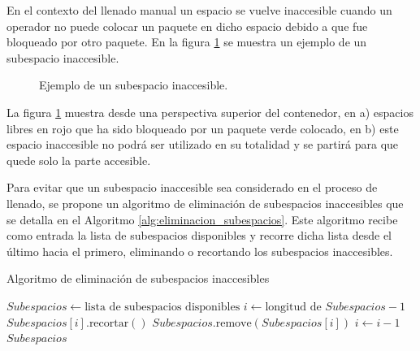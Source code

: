 \documentclass[openany]{article}
\begin{document}
En el contexto del llenado manual un espacio se vuelve inaccesible cuando un operador no puede colocar un paquete en dicho espacio debido a que fue bloqueado por otro paquete. En la figura \ref{fig:subespacio_inaccesible} se muestra un ejemplo de un subespacio inaccesible.

\begin{figure}[H]
    \centering
    
    \caption{Ejemplo de un subespacio inaccesible.}
    \label{fig:subespacio_inaccesible}
\end{figure}

La figura \ref{fig:subespacio_inaccesible} muestra desde una perspectiva superior del contenedor, en a) espacios libres en rojo que ha sido bloqueado por un paquete verde colocado, en b) este espacio inaccesible no podrá ser utilizado en su totalidad y se partirá para que quede solo la parte accesible.

Para evitar que un subespacio inaccesible sea considerado en el proceso de llenado, se propone un algoritmo de eliminación de subespacios inaccesibles que se detalla en el Algoritmo \ref{alg:eliminacion_subespacios}. Este algoritmo recibe como entrada la lista de subespacios disponibles y recorre dicha lista desde el último hacia el primero, eliminando o recortando los subespacios inaccesibles.

\begin{algorithm}[H]
    \caption{Algoritmo de eliminación de subespacios inaccesibles}
    \label{alg:eliminacion_subespacios}
    \begin{algorithmic}[1]
        \State $Subespacios \gets \text{lista de subespacios disponibles}$
        \State $i \gets \text{longitud de } Subespacios - 1$
        \State $Subespacios[i].\text{recortar}()$
        \State $Subespacios.\text{remove}(Subespacios[i])$
        \EndIf
        \State $i \gets i - 1$
        \EndWhile
        \State \Return $Subespacios$
    \end{algorithmic}
\end{algorithm}
\end{document}
